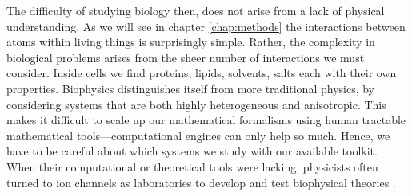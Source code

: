 The difficulty of studying biology then, does not arise from a lack of physical understanding. As we will see in chapter \ref{chap:methods} the interactions between atoms within living things is surprisingly simple. Rather, the complexity in biological problems arises from the sheer number of interactions we must consider. Inside cells we find proteins, lipids, solvents, salts each with their own properties. Biophysics distinguishes itself from more traditional physics, by considering systems that are both highly heterogeneous and anisotropic. This makes it difficult to scale up our mathematical formalisms using human tractable mathematical tools---computational engines can only help so much. Hence, we have to be careful about which systems we study with our available toolkit. When their computational or theoretical tools were lacking, physicists often turned to ion channels as laboratories to develop and test biophysical theories \cite{moy2000, corry2000}.







